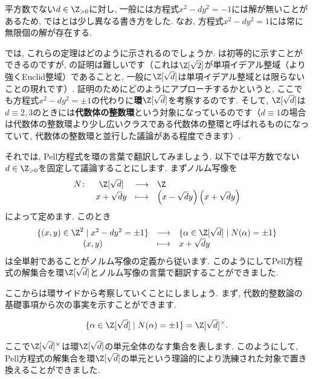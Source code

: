 \documentclass[11pt,b5paper,oneside,titlepage,lualatex]{ltjsreport}
\begin{document}
\begin{rem}{}{}
	平方数でない$ d \in \Z_{>0} $に対し, 一般には方程式$ x^2 - dy^2 = -1 $には解が無いことがあるため, ではとは少し異なる書き方をした. 
	なお, 方程式$ x^2 - dy^2 = 1 $には常に無限個の解が存在する. 
\end{rem}

では, これらの定理はどのように示されるのでしょうか. 
は初等的に示すことができるのですが, の証明は難しいです（これは$ \Z[\sqrt{2}] $が単項イデアル整域（より強くEuclid整域）であることと, 一般に$ \Z[\sqrt{d}] $は単項イデアル整域とは限らないことの現れです）. 
証明のためにどのようにアプローチするかというと, ここでも方程式$ x^2 - dy^2 = \pm 1 $の代わりに\textbf{環}$ \Z[\sqrt{d}] $を考察するのです. 
そして, $ \Z[\sqrt{d}] $は$ d \equiv 2, 3 $のときには\textbf{代数体の整数環}という対象になっているのです（$ d \equiv 1 $の場合は代数体の整数環より少し広いクラスである代数体の整環と呼ばれるものになっていて, 代数体の整数環と並行した議論がある程度できます）. 

それでは, Pell方程式を環の言葉で翻訳してみましょう. 
以下では平方数でない$ d \in \Z_{>0} $を固定して議論することにします. 
まずノルム写像を
\[
\begin{array}{cccl}
	N \colon & \Z[\sqrt{d}] & \longrightarrow & \Z \\
	& x + \sqrt{d}y & \longmapsto & \left(x - \sqrt{d}y \right) \left(x + \sqrt{d}y \right)
\end{array}
\]
によって定めます. 
このとき
\[
\begin{array}{ccl}
	\{ (x, y) \in \Z^2 \mid x^2 - dy^2 = \pm 1 \} & \longrightarrow & \{ \alpha \in \Z[\sqrt{d}] \mid N(\alpha) = \pm 1 \} \\
	(x, y) & \longmapsto & x + \sqrt{d}y
\end{array}
\]
は全単射であることがノルム写像の定義から従います. 
このようにしてPell方程式の解集合を環$ \Z[\sqrt{d}] $とノルム写像の言葉で翻訳することができました. 

ここからは環サイドから考察していくことにしましょう. 
まず, 代数的整数論の基礎事項から次の事実を示すことができます. 

\begin{lem}{}{}
	\[
	\{ \alpha \in \Z[\sqrt{d}] \mid N(\alpha) = \pm 1 \}
	= \Z[\sqrt{d}]^\times.
	\]
\end{lem}

ここで$ \Z[\sqrt{d}]^\times $は環$ \Z[\sqrt{d}] $の単元全体のなす集合を表します. 
このようにして, Pell方程式の解集合を環$ \Z[\sqrt{d}] $の単元という理論的により洗練された対象で置き換えることができました. 
\end{document}
